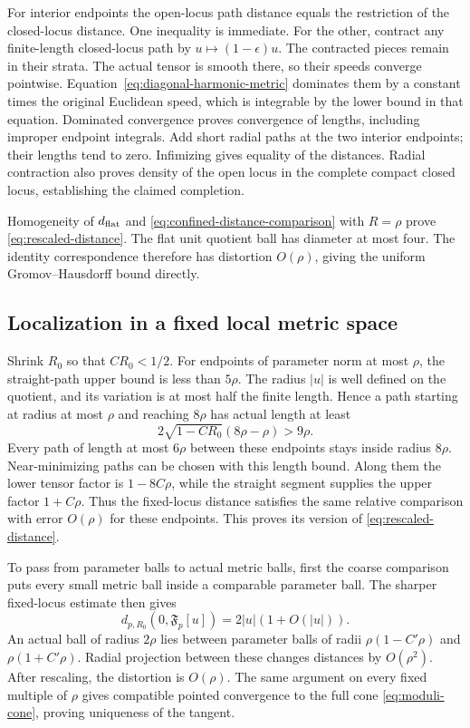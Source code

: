 For interior endpoints the open-locus path distance
equals the restriction of the closed-locus distance.
One inequality is immediate. For the other, contract
any finite-length closed-locus path by $u\mapsto(1-\epsilon)u$.
The contracted pieces remain in their strata. The actual
tensor is smooth there, so their speeds converge pointwise.
Equation~\eqref{eq:diagonal-harmonic-metric} dominates
them by a constant times the original Euclidean speed,
which is integrable by the lower bound in that equation.
Dominated convergence proves convergence of lengths,
including improper endpoint integrals. Add short radial
paths at the two interior endpoints; their lengths tend
to zero. Infimizing gives equality of the distances.
Radial contraction also proves density of the open
locus in the complete compact closed locus, establishing
the claimed completion.

Homogeneity of $d_{\rm flat}$ and
\eqref{eq:confined-distance-comparison} with $R=\rho$
prove \eqref{eq:rescaled-distance}. The flat unit quotient
ball has diameter at most four. The identity correspondence
therefore has distortion $O(\rho)$, giving the uniform
Gromov--Hausdorff bound directly.

\subsection{Localization in a fixed local metric space}

Shrink $R_0$ so that $CR_0<1/2$.
For endpoints of parameter norm at most $\rho$, the
straight-path upper bound is less than $5\rho$.
The radius $|u|$ is well defined on the quotient, and
its variation is at most half the finite length.
Hence a path starting at radius at most $\rho$ and
reaching $8\rho$ has actual length at least
\[
             2\sqrt{1-CR_0}(8\rho-\rho)>9\rho.
\]
Every path of length at most $6\rho$ between these
endpoints stays inside radius $8\rho$. Near-minimizing
paths can be chosen with this length bound. Along them
the lower tensor factor is $1-8C\rho$, while the
straight segment supplies the upper factor $1+C\rho$.
Thus the fixed-locus distance satisfies the same relative
comparison with error $O(\rho)$ for these endpoints.
This proves its version of \eqref{eq:rescaled-distance}.

To pass from parameter balls to actual metric balls,
first the coarse comparison puts every small metric
ball inside a comparable parameter ball. The sharper
fixed-locus estimate then gives
\[
          d_{p,R_0}(0,\mathfrak F_p[u])=2|u|(1+O(|u|)).
\]
An actual ball of radius $2\rho$ lies between parameter
balls of radii $\rho(1-C'\rho)$ and $\rho(1+C'\rho)$.
Radial projection between these changes distances by
$O(\rho^2)$. After rescaling, the distortion is $O(\rho)$.
The same argument on every fixed multiple of $\rho$
gives compatible pointed convergence to the full cone
\eqref{eq:moduli-cone}, proving uniqueness of the tangent.

